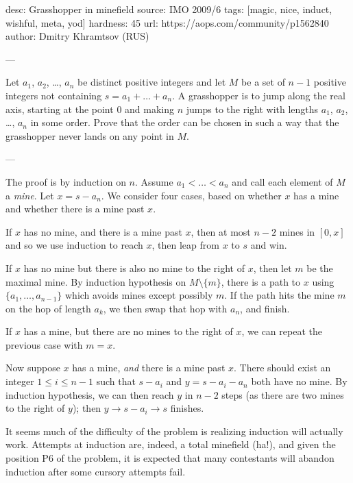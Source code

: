 desc:  Grasshopper in minefield
source:  IMO 2009/6
tags:  [magic, nice, induct, wishful, meta, yod]
hardness: 45
url: https://aops.com/community/p1562840
author: Dmitry Khramtsov (RUS)

---

Let $a_1$, $a_2$, \dots, $a_n$ be distinct positive integers and
let $M$ be a set of $n-1$ positive integers not containing $s = a_1 + \dots + a_n$.
A grasshopper is to jump along the real axis, starting at the point $0$ and
making $n$ jumps to the right with lengths $a_1$, $a_2$, \dots, $a_n$ in some order.
Prove that the order can be chosen in such a way that
the grasshopper never lands on any point in $M$.

---

The proof is by induction on $n$.
Assume $a_1 < \dots < a_n$ and call each element of $M$ a \emph{mine}.
Let $x = s - a_n$.
We consider four cases, based on whether $x$ has a mine
and whether there is a mine past $x$.
\begin{itemize}
  \ii If $x$ has no mine, and there is a mine past $x$,
  then at most $n-2$ mines in $[0, x]$ and so we use induction to reach $x$,
  then leap from $x$ to $s$ and win.

  \ii If $x$ has no mine but there is also no mine to the right of $x$,
  then let $m$ be the maximal mine.
  By induction hypothesis on $M \setminus \{m\}$, there is a path to $x$
  using $\{a_1, \dots, a_{n-1}\}$ which avoids mines except possibly $m$.
  If the path hits the mine $m$ on the hop of length $a_k$,
  we then swap that hop with $a_n$, and finish.

  \ii If $x$ has a mine, but there are no mines to the right of $x$,
  we can repeat the previous case with $m = x$.

  \ii Now suppose $x$ has a mine, \emph{and} there is a mine past $x$.
  There should exist an integer $1 \le i \le n-1$
  such that $s-a_i$ and $y = s-a_i-a_n$ both have no mine.
  By induction hypothesis, we can then reach $y$ in $n-2$ steps
  (as there are two mines to the right of $y$); then $y \to s-a_i \to s$ finishes.
\end{itemize}

\begin{remark*}
  It seems much of the difficulty of the problem is
  realizing induction will actually work.
  Attempts at induction are, indeed, a total minefield (ha!),
  and given the position P6 of the problem,
  it is expected that many contestants will abandon
  induction after some cursory attempts fail.
\end{remark*}
